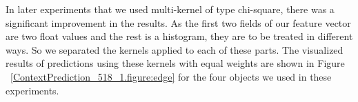 In later experiments that we used multi-kernel of type chi-square, there was a significant improvement in the results.
As the first two fields of our feature vector are two float values and the rest is a histogram, they are to be treated 
in different ways.
So we separated the kernels applied to each of these parts.
The visualized results of predictions using these kernels with equal weights are shown in Figure ~\ref{ContextPrediction_518_1.figure:edge} 
for the four objects we used in these experiments.

\begin{figure} [htp]
   \begin{center}
     \\
     \\

\end{center}
\end{figure}
